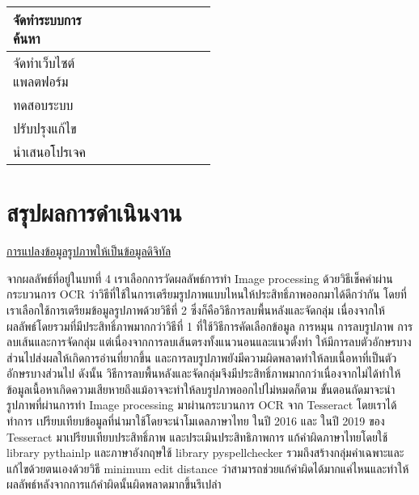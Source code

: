 \begin{table}[H]
\begin{tabular}{|p{0.5\linewidth}|l|l|l|}
จัดทำระบบการค้นหา                                                                    &                                      &           &  \cellcolor[HTML]{92D050}                               \\ \hline
จัดทำเว็บไซต์แพลตฟอร์ม                                                               &                                      &                                     & \cellcolor[HTML]{92D050}       \\ \hline
ทดสอบระบบ                                                                            &                                      &            &  \cellcolor[HTML]{92D050}                               \\ \hline
ปรับปรุงแก้ไข                                                                        &                                      & 	            &   \cellcolor[HTML]{92D050}                             \\ \hline
นำเสนอโปรเจค                                                                         &                 & \cellcolor[HTML]{FFC702}	               &                                 \\ \hline
\end{tabular}
\end{table}

\section{สรุปผลการดำเนินงาน}

\underline{การแปลงข้อมูลรูปภาพให้เป็นข้อมูลดิจิทัล}

จากผลลัพธ์ที่อยู่ในบทที่ 4 เราเลือกการวัดผลลัพธ์การทำ Image processing ด้วยวิธีเช็คคำผ่านกระบวนการ OCR ว่าวิธีที่ใช้ในการเตรียมรูปภาพแบบไหนให้ประสิทธิ์ภาพออกมาได้ดีกว่ากัน
โดยที่เราเลือกใช้การเตรียมข้อมูลรูปภาพด้วยวิธีที่ 2 ซึ่งก็คือวิธีการลบพื้นหลังและจัดกลุ่ม เนื่องจากให้ผลลัพธ์โดยรวมที่มีประสิทธิ์ภาพมากกว่าวิธีที่ 1 
ที่ใช้วิธีการคัดเลือกข้อมูล การหมุน การลบรูปภาพ การลบเส้นและการจัดกลุ่ม แต่เนื่องจากการลบเส้นตรงทั้งแนวนอนและแนวตั้งทำ
ให้มีการลบตัวอักษรบางส่วนไปส่งผลให้เกิดการอ่านที่ยากขึ้น 
และการลบรูปภาพยังมีความผิดพลาดทำให้ลบเนื้อหาที่เป็นตัวอักษรบางส่วนไป ดังนั้น
วิธีการลบพื้นหลังและจัดกลุ่มจึงมีประสิทธิ์ภาพมากกว่าเนื่องจากไม่ได้ทำให้ข้อมูลเนื้อหาเกิดความเสียหายถึงแม้อาจจะทำให้ลบรูปภาพออกไปไม่หมดก็ตาม 
ขั้นตอนถัดมาจะนำรูปภาพที่ผ่านการทำ Image processing มาผ่านกระบวนการ OCR จาก Tesseract โดยเราได้ทำการ
เปรียบเทียบข้อมูลที่นำมาใช้โดยจะนำโมเดลภาษาไทย ในปี 2016 และ ในปี 2019 ของ Tesseract มาเปรียบเทียบประสิทธิ์ภาพ และประเมินประสิทธิภาพการ
แก้คำผิดภาษาไทยโดยใช้ library pythainlp และภาษาอังกฤษใช้ library pyspellchecker รวมถึงสร้างกลุ่มคำเฉพาะและ
แก้ไขด้วยตนเองด้วยวิธี minimum edit distance ว่าสามารถช่วยแก้คำผิดได้มากแค่ไหนและทำให้ผลลัพธ์หลังจากการแก้คำผิดนั้นผิดพลาดมากขึ้นรึเปล่า

